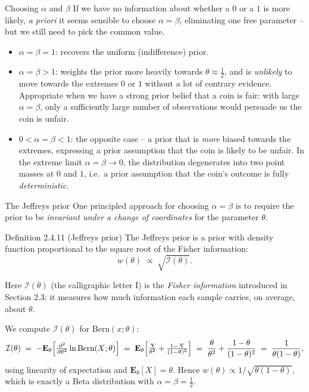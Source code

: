 \documentclass[aspectratio=169,10pt]{beamer}
\begin{document}
\begin{frame}{Choosing $\alpha$ and $\beta$}
  If we have no information about whether a $0$ or a $1$ is more likely,
  \emph{a priori} it seems sensible to choose $\alpha=\beta$, eliminating
  one free parameter -- but we still need to pick the common value.

  \begin{itemize}
    \item $\alpha=\beta=1$: recovers the uniform (indifference) prior.
    \item $\alpha=\beta>1$: weights the prior more heavily towards
      $\theta\approx\tfrac12$, and is \emph{unlikely} to move towards the
      extremes $0$ or $1$ without a lot of contrary evidence. Appropriate
      when we have a strong prior belief that a coin is fair: with large
      $\alpha=\beta$, only a sufficiently large number of observations
      would persuade us the coin is unfair.
    \item $0<\alpha=\beta<1$: the opposite case -- a prior that is
      \emph{more} biased towards the extremes, expressing a prior
      assumption that the coin is likely to be unfair. In the extreme limit
      $\alpha=\beta\to 0$, the distribution degenerates into two point
      masses at $0$ and $1$, i.e.\ a prior assumption that the coin's
      outcome is fully \emph{deterministic}.
  \end{itemize}
\end{frame}

\begin{frame}{The Jeffreys prior}
  One principled approach for choosing $\alpha=\beta$ is to require the
  prior to be \emph{invariant under a change of coordinates} for the
  parameter $\theta$.

  \begin{block}{Definition 2.4.11 (Jeffreys prior)}
    The Jeffreys prior is a prior with density function proportional to the
    square root of the Fisher information:
    \[
      w(\theta) \;\propto\; \sqrt{\mathcal I(\theta)}.
    \]
  \end{block}
  Here $\mathcal I(\theta)$ (the calligraphic letter I) is the \emph{Fisher
  information} introduced in Section 2.3: it measures how much information
  each sample carries, on average, about $\theta$.

  We compute $\mathcal I(\theta)$ for $\mathrm{Bern}(x;\theta)$:
  \[
    \mathcal I(\theta) \;=\; -\mathbf E_\theta\Bigl[\tfrac{\partial^2}{\partial\theta^2}\ln\mathrm{Bern}(X;\theta)\Bigr]
    \;=\; \mathbf E_\theta\Bigl[\tfrac{X}{\theta^2}+\tfrac{1-X}{(1-\theta)^2}\Bigr]
    \;=\; \frac{\theta}{\theta^2}+\frac{1-\theta}{(1-\theta)^2} \;=\; \frac{1}{\theta(1-\theta)},
  \]
  using linearity of expectation and $\mathbf E_\theta[X]=\theta$. Hence
  $w(\theta)\propto 1/\sqrt{\theta(1-\theta)}$, which is exactly a Beta
  distribution with $\alpha=\beta=\tfrac12$.
\end{frame}
\end{document}
